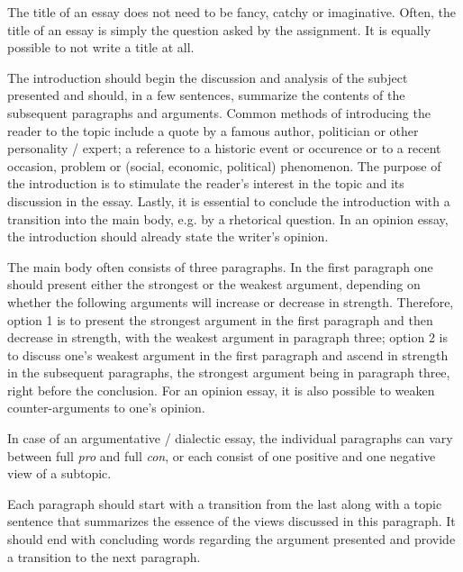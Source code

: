 \begin{enumerate}


	The title of an essay does not need to be fancy, catchy or imaginative. Often, the title of an essay is simply the question asked by the assignment. It is equally possible to not write a title at all.


	The introduction should begin the discussion and analysis of the subject presented and should, in a few sentences, summarize the contents of the subsequent paragraphs and arguments. Common methods of introducing the reader to the topic include a quote by a famous author, politician or other personality / expert; a reference to a historic event or occurence or to a recent occasion, problem or (social, economic, political) phenomenon. The purpose of the introduction is to stimulate the reader's interest in the topic and its discussion in the essay. Lastly, it is essential to conclude the introduction with a transition into the main body, e.g. by a rhetorical question. In an opinion essay, the introduction should already state the writer's opinion.


	The main body often consists of three paragraphs. In the first paragraph one should present either the strongest or the weakest argument, depending on whether the following arguments will increase or decrease in strength. Therefore, option 1 is to present the strongest argument in the first paragraph and then decrease in strength, with the weakest argument in paragraph three; option 2 is to discuss one's weakest argument in the first paragraph and ascend in strength in the subsequent paragraphs, the strongest argument being in paragraph three, right before the conclusion. For an opinion essay, it is also possible to weaken counter-arguments to one's opinion.

	\extrapar

	In case of an argumentative / dialectic essay, the individual paragraphs can vary between full \emph{pro} and full \emph{con}, or each consist of one positive and one negative view of a subtopic. 

	\extrapar

	Each paragraph should start with a transition from the last along with a topic sentence that summarizes the essence of the views discussed in this paragraph. It should end with concluding words regarding the argument presented and provide a transition to the next paragraph.


\end{enumerate}
